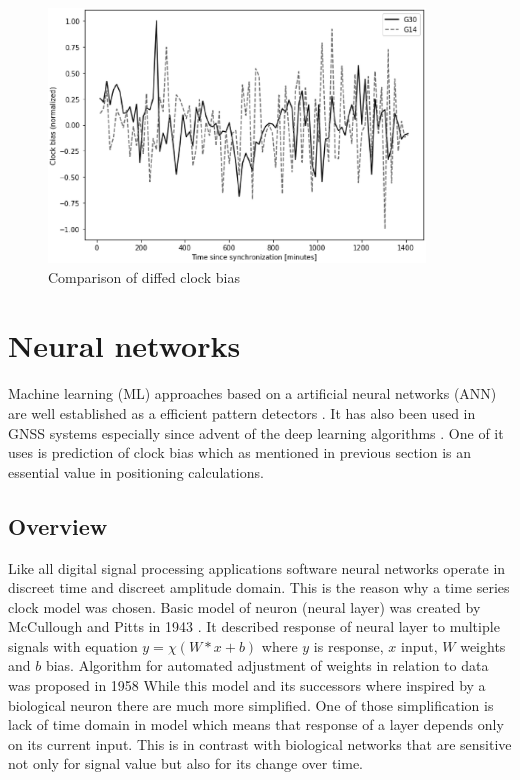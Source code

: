 \documentclass{kybernetika}
\begin{document}
\begin{figure}[ht] 
\centering
	\includegraphics[width=10cm]{figures/bias_normalized}
\caption{Comparison of diffed clock bias}
\label{fig:diffed_shifts}
\end{figure}

\section{Neural networks}
Machine learning (ML) approaches based on a artificial neural networks (ANN) are
well established as a efficient pattern detectors \cite{Abiodun2019} \cite{Miller1993}
\cite{Faraway2008} \cite{Herbrich1999} \cite{Khan2019}.
It has also been used in GNSS systems especially since advent of the deep learning
algorithms \cite{Wei2016} \cite{Kim2019} \cite{OrusPerez2019}.
One of it uses is prediction of clock bias \cite{Wang2017} \cite{Indriyatmoko2008}
which as mentioned in previous section is an essential value in positioning calculations.

\subsection{Overview}  
Like all digital signal processing applications software neural networks operate in
discreet time and discreet amplitude domain. This is the reason why a time series clock model
was chosen. Basic model of neuron (neural layer) was created by McCullough and Pitts in 1943
\cite{McCulloch1943}. It described response of neural layer to multiple signals with
equation $y= \chi (W*x+b)$ where $y$ is response, $x$ input, $W$ weights and $b$ bias.
Algorithm for automated adjustment of weights in relation to data was proposed in 1958
While this model and its successors where inspired by a biological neuron there are much
more simplified. One of those simplification is lack of time domain in model which means
that response of a layer depends only on its current input.
This is in contrast with biological networks that are sensitive not only for signal value
but also for its change over time.
\end{document}
